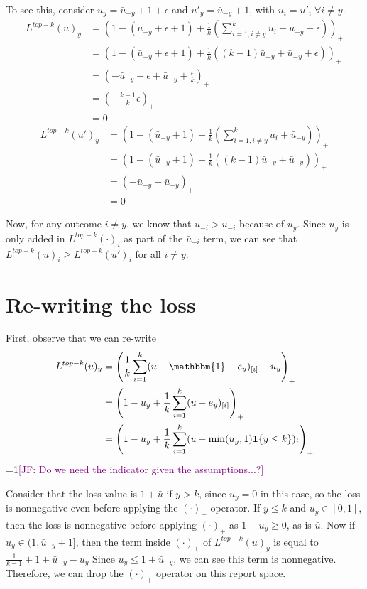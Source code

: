 \documentclass[12pt]{article}
\newcommand{\Comments}{1}
\newcommand{\mynote}[2]{\ifnum\Comments=1\textcolor{#1}{#2}\fi}
\newcommand{\jessie}[1]{\mynote{purple}{[JF: #1]}}
\newcommand{\ubar}{\bar{u}}
\newcommand{\ones}{\mathbbm{1}}
\newcommand{\Ind}[1]{\mathbf{1}\{#1\}}
\begin{document}
To see this, consider $u_y = \bar u_{-y} + 1 + \epsilon$ and $u'_y = \bar u_{-y} + 1$, with $u_i = u'_i \; \forall i \neq y$. 
\begin{align*}
L^{top-k}(u)_y &= \left(1 - (\bar u_{-y} + \epsilon + 1) + \frac 1 k \left(\sum_{i=1, i \neq y}^k u_i + \bar u_{-y} + \epsilon\right) \right)_+\\ 
&= \left(1 - (\bar u_{-y} + \epsilon + 1) + \frac 1 k \left((k-1) \bar u_{-y} + \bar u_{-y} + \epsilon\right) \right)_+\\
&= \left(-\bar u_{-y} - \epsilon + \bar u_{-y} + \frac \epsilon k \right)_+ \\
&= (-\frac{k-1}{k}\epsilon)_+\\
&= 0
\end{align*}
\begin{align*}
L^{top-k}(u')_y &= \left(1 - (\bar u_{-y} + 1) + \frac 1 k \left(\sum_{i=1, i \neq y}^k u_i + \bar u_{-y} \right) \right)_+\\ 
&= \left(1 - (\bar u_{-y} + 1) + \frac 1 k \left((k-1) \bar u_{-y} + \bar u_{-y} \right) \right)_+\\
&= \left(-\bar u_{-y} + \bar u_{-y}\right)_+ \\
&= 0
\end{align*}

Now, for any outcome $i \neq y$, we know that $\bar u_{-i} > \bar u_{-i}$ because of $u_y$.
Since $u_y$ is only added in $L^{top-k}(\cdot)_i$ as part of the $\bar u_{-i}$ term, we can see that $L^{top-k}(u)_i \geq L^{top-k}(u')_i$ for all $i \neq y$.

\section{Re-writing the loss}

First, observe that we can re-write
\begin{align*} 
L^{top-k}(u)_y&=\left(\frac{1}{k} \sum_{i=1}^k (u + \ones - e_y)_{[i]} - u_y \right)_+\\ 
&=\left(1 - u_y + \frac{1}{k} \sum_{i=1}^k (u - e_y)_{[i]} \right)_+\\
&=\left(1 - u_y + \frac{1}{k} \sum_{i=1}^k (u - \min(u_y, 1)\Ind{y \leq k})_{i} \right)_+
\end{align*}
\jessie{Do we need the indicator given the assumptions...?}

Consider that the loss value is $1 + \bar u$ if $y > k$, since $u_y = 0$ in this case, so the loss is nonnegative even before applying the $(\cdot)_+$ operator.
If $y \leq k$ and $u_y \in [0,1]$, then the loss is nonnegative before applying $(\cdot)_+$ as $1-u_y \geq 0$, as is $\bar u$.
Now if $u_y \in (1, \bar u_{-y} + 1]$, then the term inside $(\cdot)_+$ of $L^{top-k}(u)_y$ is equal to $\frac{1}{k-1} + 1 +  \ubar_{-y} - u_y $
Since $u_y \leq 1 +  \ubar_{-y}$, we can see this term is nonnegative.
Therefore, we can drop the $(\cdot)_+$ operator on this report space.
\end{document}

